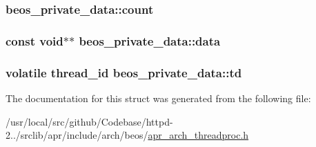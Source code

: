 \subsubsection[{\texorpdfstring{count}{count}}]{ beos\+\_\+private\+\_\+data\+::count}\hypertarget{structbeos__private__data_a5bafc455b7c497c0d725e003efd9bd2e}{}\label{structbeos__private__data_a5bafc455b7c497c0d725e003efd9bd2e}
\subsubsection[{\texorpdfstring{data}{data}}]{\setlength{\rightskip}{0pt plus 5cm}const {\bf void}$\ast$$\ast$ beos\+\_\+private\+\_\+data\+::data}\hypertarget{structbeos__private__data_a28f3903503049e39eb2bb7e5a0732904}{}\label{structbeos__private__data_a28f3903503049e39eb2bb7e5a0732904}
\subsubsection[{\texorpdfstring{td}{td}}]{\setlength{\rightskip}{0pt plus 5cm}volatile thread\+\_\+id beos\+\_\+private\+\_\+data\+::td}\hypertarget{structbeos__private__data_a448674605355f85613d487dc5d755423}{}\label{structbeos__private__data_a448674605355f85613d487dc5d755423}


The documentation for this struct was generated from the following file\+:\begin{DoxyCompactItemize}
\item 
/usr/local/src/github/\+Codebase/httpd-\/2../srclib/apr/include/arch/beos/\hyperlink{beos_2apr__arch__threadproc_8h}{apr\+\_\+arch\+\_\+threadproc.\+h}\end{DoxyCompactItemize}
